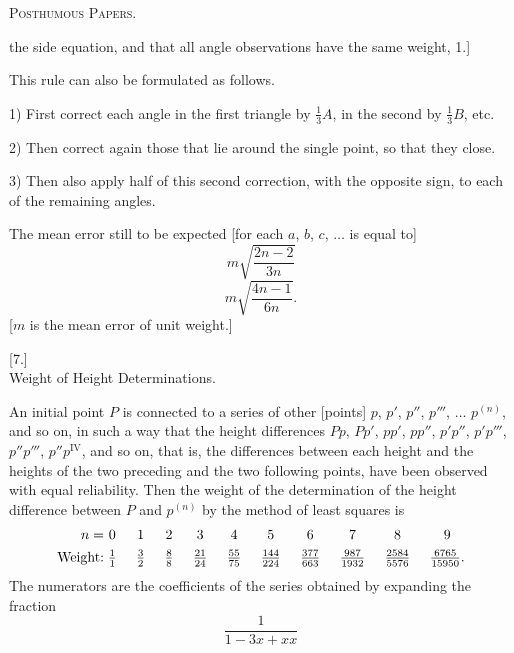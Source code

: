 \clearpage
{}\hfill\textsc{Posthumous Papers.}\hfill\mbox{}\par\medskip
\noindent the side equation, and that all angle observations have the same weight, 1.]

This rule can also be formulated as follows.

1) First correct each angle in the first triangle by $\frac13A$, in the second by $\frac13B$, etc.

2) Then correct again those that lie around the single point, so that they close.

3) Then also apply half of this second correction, with the opposite sign, to each of the remaining angles.

The mean error still to be expected [for each $a$, $b$, $c$, $\ldots$ is equal to]
\[
m\sqrt{\frac{2n-2}{3n}}
\]
\[
m\sqrt{\frac{4n-1}{6n}}.
\]
[$m$ is the mean error of unit weight.]
\bigskip
\begin{center}[7.]\\[5pt]Weight of Height Determinations.\end{center}
An initial point $P$ is connected to a series of other [points] $p$, $p'$, $p''$, $p'''$, $\ldots$ $p^{(n)}$, and so on, in such a way that the height differences $Pp$, $Pp'$, $pp'$, $pp''$, $p'p''$, $p'p'''$, $p''p'''$, $p''p^{\mathrm{IV}}$, and so on, that is, the differences between each height and the heights of the two preceding and the two following points, have been observed with equal reliability. Then the weight of the determination of the height difference between $P$ and $p^{(n)}$ by the method of least squares is
\[
\setlength{\arraycolsep}{7pt}
\begin{array}{r@{\;}cccccccccc}
n=&0&1&2&3&4&5&6&7&8&9\\[4pt]
\text{Weight:}&\frac11&\frac32&\frac88&\frac{21}{24}&\frac{55}{75}&\frac{144}{224}&\frac{377}{663}&\frac{987}{1932}&\frac{2584}{5576}&\frac{6765}{15950}.
\end{array}
\]
The numerators are the coefficients of the series obtained by expanding the fraction
\[
\frac1{1-3x+xx}
\]

